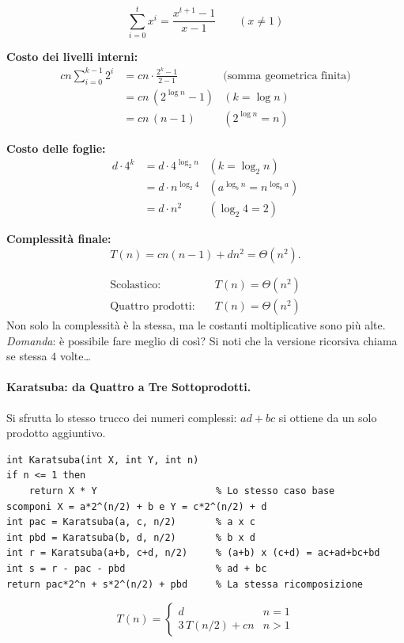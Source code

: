 \documentclass[12pt, a4paper]{article}
\begin{document}
\begin{tcolorbox}[colback=lightergray!5, colframe=tocsubsec, title=\textbf{Somma Geometrica Finita}]
\label{prop:somma-geometrica-finita}
$$\sum_{i=0}^{t} x^i = \frac{x^{t+1}-1}{x-1} \qquad (x \neq 1)$$
\end{tcolorbox}

\textbf{Costo dei livelli interni:}
\begin{align*}
cn\sum_{i=0}^{k-1}2^i &= cn\cdot\frac{2^k-1}{2-1} & \text{(somma geometrica finita)} \\
&= cn\,(2^{\log n}-1) & (k=\log n) \\
&= cn\,(n-1) & (2^{\log n}=n)
\end{align*}

\textbf{Costo delle foglie:}
\begin{align*}
d\cdot 4^k &= d\cdot 4^{\log_2 n} & (k=\log_2 n) \\
&= d\cdot n^{\log_2 4} & (a^{\log_b n}=n^{\log_b a}) \\
&= d\cdot n^2 & (\log_2 4 = 2)
\end{align*}

\textbf{Complessità finale:}
$$T(n) = cn(n-1) + dn^2 = \Theta(n^2).$$

\begin{tcolorbox}[colback=lightergray!5, colframe=tocsubsec, title=\textbf{Tanto Lavoro per Nulla!}]
\begin{align*}
\text{Scolastico:}\quad & T(n)=\Theta(n^2) \\
\text{Quattro prodotti:}\quad & T(n)=\Theta(n^2)
\end{align*}
Non solo la complessità è la stessa, ma le costanti moltiplicative sono più alte. \textit{Domanda}: è possibile fare meglio di così? Si noti che la versione ricorsiva chiama se stessa $4$ volte\ldots
\end{tcolorbox}

\paragraph{Karatsuba: da Quattro a Tre Sottoprodotti.}
Si sfrutta lo stesso trucco dei numeri complessi: $ad+bc$ si ottiene da un solo prodotto aggiuntivo.
\begin{verbatim}
int Karatsuba(int X, int Y, int n)
if n <= 1 then
    return X * Y                     % Lo stesso caso base
scomponi X = a*2^(n/2) + b e Y = c*2^(n/2) + d
int pac = Karatsuba(a, c, n/2)       % a x c
int pbd = Karatsuba(b, d, n/2)       % b x d
int r = Karatsuba(a+b, c+d, n/2)     % (a+b) x (c+d) = ac+ad+bc+bd
int s = r - pac - pbd                % ad + bc
return pac*2^n + s*2^(n/2) + pbd     % La stessa ricomposizione
\end{verbatim}
$$T(n) = \begin{cases} d & n = 1 \\ 3\,T(n/2) + cn & n > 1 \end{cases}$$
\end{document}
